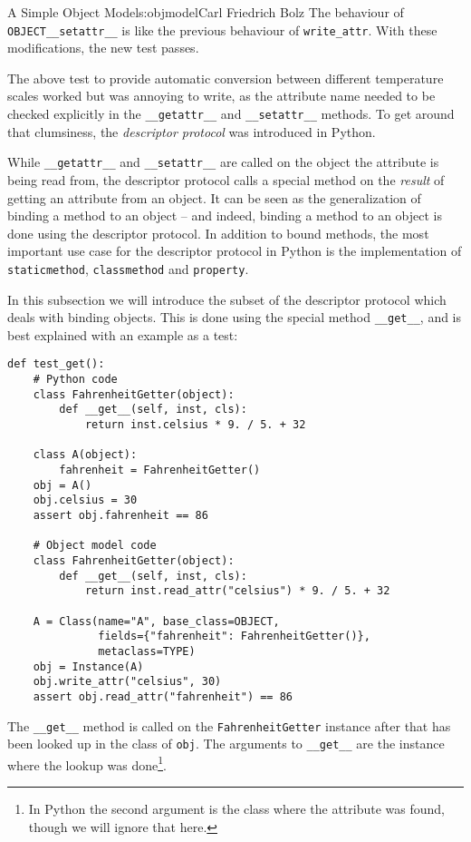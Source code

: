 \begin{aosachapter}{A Simple Object Model}{s:objmodel}{Carl Friedrich Bolz}
The behaviour of \texttt{OBJECT\_\_setattr\_\_} is like the previous
behaviour of \texttt{write\_attr}. With these modifications, the new
test passes.

\label{descriptor-protocol}

The above test to provide automatic conversion between different
temperature scales worked but was annoying to write, as the attribute
name needed to be checked explicitly in the \texttt{\_\_getattr\_\_} and
\texttt{\_\_setattr\_\_} methods. To get around that clumsiness, the
\emph{descriptor protocol} was introduced in Python.

While \texttt{\_\_getattr\_\_} and \texttt{\_\_setattr\_\_} are called
on the object the attribute is being read from, the descriptor protocol
calls a special method on the \emph{result} of getting an attribute from
an object. It can be seen as the generalization of binding a method to
an object -- and indeed, binding a method to an object is done using the
descriptor protocol. In addition to bound methods, the most important
use case for the descriptor protocol in Python is the implementation of
\texttt{staticmethod}, \texttt{classmethod} and \texttt{property}.

In this subsection we will introduce the subset of the descriptor
protocol which deals with binding objects. This is done using the
special method \texttt{\_\_get\_\_}, and is best explained with an
example as a test:

\begin{verbatim}
def test_get():
    # Python code
    class FahrenheitGetter(object):
        def __get__(self, inst, cls):
            return inst.celsius * 9. / 5. + 32

    class A(object):
        fahrenheit = FahrenheitGetter()
    obj = A()
    obj.celsius = 30
    assert obj.fahrenheit == 86

    # Object model code
    class FahrenheitGetter(object):
        def __get__(self, inst, cls):
            return inst.read_attr("celsius") * 9. / 5. + 32

    A = Class(name="A", base_class=OBJECT,
              fields={"fahrenheit": FahrenheitGetter()},
              metaclass=TYPE)
    obj = Instance(A)
    obj.write_attr("celsius", 30)
    assert obj.read_attr("fahrenheit") == 86
\end{verbatim}

The \texttt{\_\_get\_\_} method is called on the
\texttt{FahrenheitGetter} instance after that has been looked up in the
class of \texttt{obj}. The arguments to \texttt{\_\_get\_\_} are the
instance where the lookup was done\footnote{In Python the second
  argument is the class where the attribute was found, though we will
  ignore that here.}.


\end{aosachapter}

